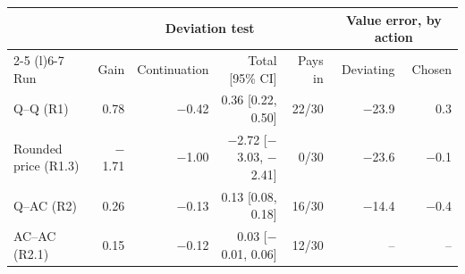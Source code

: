 \begin{tabular}{@{}lrrrrrr@{}}
\toprule
 & \multicolumn{4}{c}{Deviation test} & \multicolumn{2}{c}{Value error, by action} \\
\cmidrule(lr){2-5} \cmidrule(l){6-7}
Run & Gain & Continuation & Total [95\% CI] & Pays in & Deviating & Chosen \\
\midrule
Q–Q (R1) & 0.78 & $-$0.42 & 0.36 [0.22, 0.50] & 22/30 & $-$23.9 & 0.3 \\
Rounded price (R1.3) & $-$1.71 & $-$1.00 & $-$2.72 [$-$3.03, $-$2.41] & 0/30 & $-$23.6 & $-$0.1 \\
Q–AC (R2) & 0.26 & $-$0.13 & 0.13 [0.08, 0.18] & 16/30 & $-$14.4 & $-$0.4 \\
AC–AC (R2.1) & 0.15 & $-$0.12 & 0.03 [$-$0.01, 0.06] & 12/30 & – & – \\
\bottomrule
\end{tabular}
